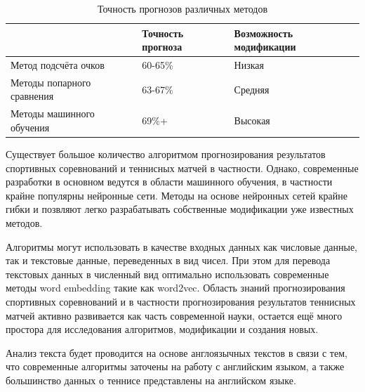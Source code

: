 \begin{table}[!h]
	
	\caption{\label{tab:table3}Точность прогнозов различных методов}
	
	\begin{center}
		\begin{tabular}{|l|l|l|}
			
			\hline
			
			& Точность прогноза & Возможность модификации \\
			\hline
			Метод подсчёта очков  & 60-65\% & Низкая \\
			\hline
			Методы попарного сравнения  & 63-67\% & Средняя  \\
			\hline
			Методы машинного обучения  & 69\%+ & Высокая  \\
			\hline
			
		\end{tabular}
		
	\end{center}
	
\end{table}
Существует большое количество алгоритмом прогнозирования результатов спортивных соревнований и теннисных матчей в частности. Однако, современные разработки в основном ведутся в области машинного обучения, в частности крайне популярны нейронные сети. Методы на основе нейронных сетей крайне гибки и позвляют легко разрабатывать собственные модификации уже известных методов.

Алгоритмы могут использовать в качестве входных данных как числовые данные, так и текстовые данные, переведенных в вид чисел.
 При этом для перевода текстовых данных  в численный вид оптимально использовать современные методы word embedding такие как word2vec.
 Область знаний прогнозирования спортивных соревнований и в частности прогнозирования результатов теннисных
 матчей активно развивается как часть современной науки, остается ещё много простора для исследования алгоритмов, модификации и со­здания новых.
 
Анализ текста будет проводится на основе англоязычных текстов в связи с тем, что современные алгоритмы заточены на работу с английским языком, а также большинство данных о теннисе представлены на английском языке.